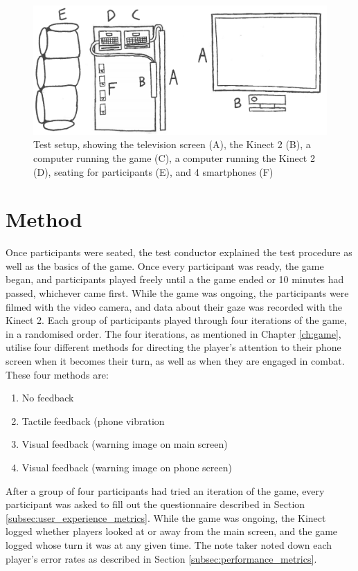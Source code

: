 \begin{figure}[h!]
	\centering
	\includegraphics[width=\textwidth]{figures/test_setup.png}
	\caption{Test setup, showing the television screen (A), the Kinect 2 (B), a computer running the game (C), a computer running the Kinect 2 (D), seating for participants (E), and 4 smartphones (F)}\label{fig:test_setup}
\end{figure}

\section{Method}
Once participants were seated, the test conductor explained the test procedure as well as the basics of the game. Once every participant was ready, the game began, and participants played freely until a the game ended or 10 minutes had passed, whichever came first. While the game was ongoing, the participants were filmed with the video camera, and data about their gaze was recorded with the Kinect 2. Each group of participants played through four iterations of the game, in a randomised order. The four iterations, as mentioned in Chapter \ref{ch:game}, utilise four different methods for directing the player's attention to their phone screen when it becomes their turn, as well as when they are engaged in combat. These four methods are:

\begin{enumerate}[label=\Alph*)]
	\item No feedback
	\item Tactile feedback (phone vibration
	\item Visual feedback (warning image on main screen)
	\item Visual feedback (warning image on phone screen)
\end{enumerate}

After a group of four participants had tried an iteration of the game, every participant was asked to fill out the questionnaire described in Section \ref{subsec:user_experience_metrics}. While the game was ongoing, the Kinect logged whether players looked at or away from the main screen, and the game logged whose turn it was at any given time. The note taker noted down each player's error rates as described in Section \ref{subsec:performance_metrics}.

